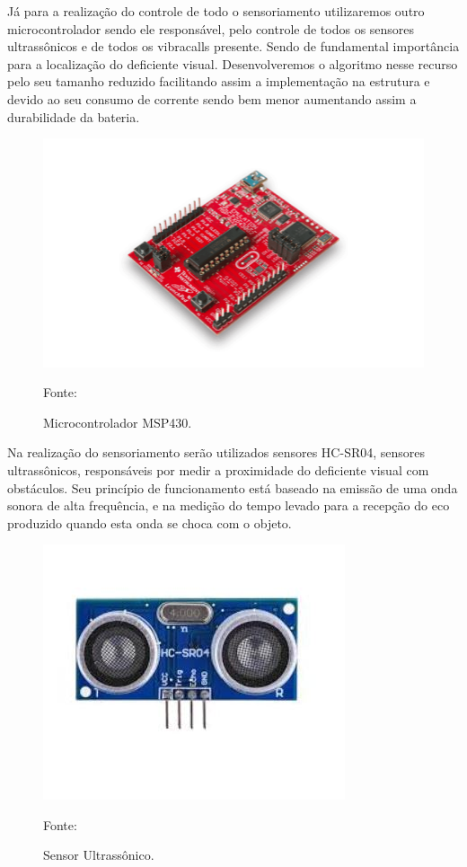 Já para a realização do controle de todo o sensoriamento utilizaremos outro microcontrolador sendo ele responsável, pelo controle de todos os sensores ultrassônicos e de todos os vibracalls presente. Sendo de fundamental importância para a localização do deficiente visual. Desenvolveremos o algoritmo nesse recurso pelo seu tamanho reduzido facilitando assim a implementação na estrutura e devido ao seu consumo de corrente sendo bem menor aumentando assim a durabilidade da bateria.

\begin{figure}[h]
\includegraphics[scale=0.4]{figuras/Capitulo4/msp.png}
\centering
\caption{Microcontrolador MSP430.}
\label{fig:msp.png}
Fonte: \cite{msp}
\end{figure}

Na realização do sensoriamento serão utilizados sensores HC-SR04, sensores ultrassônicos, responsáveis por medir a proximidade do deficiente visual com obstáculos. Seu princípio de funcionamento está baseado na emissão de uma onda sonora de alta frequência, e na medição do tempo levado para a recepção do eco produzido quando esta onda se choca com o objeto.

\begin{figure}[h]
\includegraphics[scale=0.8]{figuras/Capitulo4/sensor.JPG}
\centering
\caption{Sensor Ultrassônico.}
\label{fig:sensor.jpg}
Fonte: \cite{sensor}
\end{figure}


